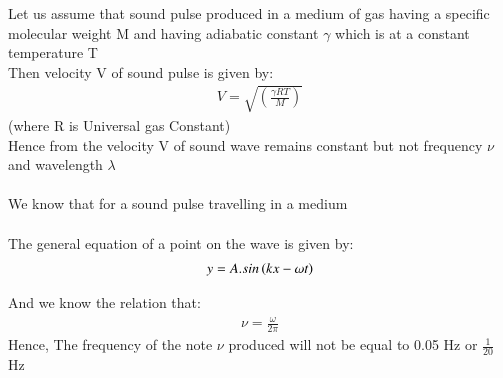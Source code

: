 \documentclass[beamer]{IEEEtran}
\theoremstyle{remark}
\begin{document}
 Let us assume that sound pulse produced in a medium of gas having a specific molecular weight M and having adiabatic constant $\gamma$ which is at a constant temperature T\\
Then velocity V of sound pulse is given by:\\
\begin{align}
    \label{a1}
    V=\sqrt{\left(\frac{\gamma RT}{M}\right)}
\end{align}(where R is Universal gas Constant)\\

Hence from \brak{\ref{a1}} the velocity V of sound wave remains constant but not frequency $\nu$ and wavelength $\lambda$\\\\
 We know that for a sound pulse travelling in a medium\\\\
The general equation of a point on the wave is given by:\\
\begin{align}
    \label{a2}
     y=A.sin\left(kx-\omega t\right)
\end{align}

And we know the relation that:
\begin{align}
    \label{a3}
    \nu = \frac{\omega}{2\pi}
\end{align}
Hence, The frequency of the note $\nu$ produced will not be equal to 0.05 Hz or $\frac{1}{20}$ Hz 
\end{document}
